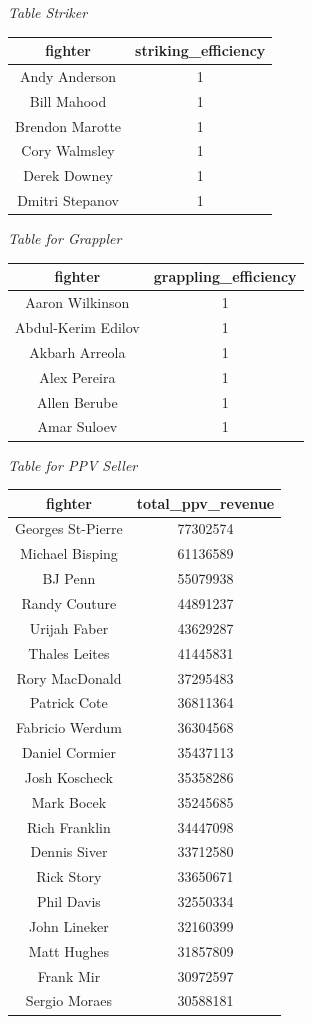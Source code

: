 \documentclass[
  man,floatsintext]{apa6}
\begin{document}
\emph{Table Striker}

\begin{tabular}{c|c}
\hline
fighter & striking\_efficiency\\
\hline
Andy Anderson & 1\\
\hline
Bill Mahood & 1\\
\hline
Brendon Marotte & 1\\
\hline
Cory Walmsley & 1\\
\hline
Derek Downey & 1\\
\hline
Dmitri Stepanov & 1\\
\hline
\end{tabular}

\emph{Table for Grappler}

\begin{tabular}{c|c}
\hline
fighter & grappling\_efficiency\\
\hline
Aaron Wilkinson & 1\\
\hline
Abdul-Kerim Edilov & 1\\
\hline
Akbarh Arreola & 1\\
\hline
Alex Pereira & 1\\
\hline
Allen Berube & 1\\
\hline
Amar Suloev & 1\\
\hline
\end{tabular}

\emph{Table for PPV Seller}

\begin{tabular}{c|c}
\hline
fighter & total\_ppv\_revenue\\
\hline
Georges St-Pierre & 77302574\\
\hline
Michael Bisping & 61136589\\
\hline
BJ Penn & 55079938\\
\hline
Randy Couture & 44891237\\
\hline
Urijah Faber & 43629287\\
\hline
Thales Leites & 41445831\\
\hline
Rory MacDonald & 37295483\\
\hline
Patrick Cote & 36811364\\
\hline
Fabricio Werdum & 36304568\\
\hline
Daniel Cormier & 35437113\\
\hline
Josh Koscheck & 35358286\\
\hline
Mark Bocek & 35245685\\
\hline
Rich Franklin & 34447098\\
\hline
Dennis Siver & 33712580\\
\hline
Rick Story & 33650671\\
\hline
Phil Davis & 32550334\\
\hline
John Lineker & 32160399\\
\hline
Matt Hughes & 31857809\\
\hline
Frank Mir & 30972597\\
\hline
Sergio Moraes & 30588181\\
\hline
\end{tabular}
\end{document}
